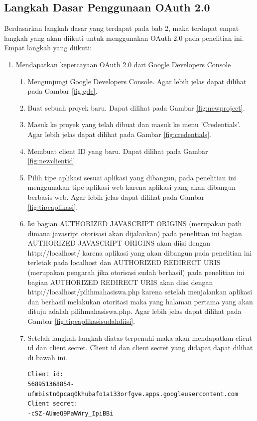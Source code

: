 \subsection{Langkah Dasar Penggunaan OAuth 2.0}
Berdasarkan langkah dasar yang terdapat pada bab 2, maka terdapat empat langkah yang akan diikuti untuk menggunakan OAuth 2.0 pada penelitian ini. Empat langkah yang diikuti:
\begin{enumerate}
\item Mendapatkan kepercayaan OAuth 2.0 dari Google Developers Console\\
    \begin{enumerate}
    \item Mengunjungi Google Developers Console. Agar lebih jelas dapat dilihat pada Gambar \ref{fig:gdc}.
    \item Buat sebuah proyek baru. Dapat dilihat pada Gambar \ref{fig:newproject}.
    \item Masuk ke proyek yang telah dibuat dan masuk ke menu 'Credentials'. Agar lebih jelas dapat dilihat pada Gambar \ref{fig:credentials}.
    \item Membuat client ID yang baru. Dapat dilihat pada Gambar \ref{fig:newclientid}.
    \item Pilih tipe aplikasi sesuai aplikasi yang dibangun, pada penelitian ini menggunakan tipe aplikasi web karena aplikasi yang akan dibangun berbasis web. Agar lebih jelas dapat dilihat pada Gambar \ref{fig:tipeaplikasi}.
    \item Isi bagian AUTHORIZED JAVASCRIPT ORIGINS (merupakan path dimana javasript otorisasi akan dijalankan) pada penelitian ini bagian AUTHORIZED JAVASCRIPT ORIGINS akan diisi dengan http://localhost/ karena aplikasi yang akan dibangun pada penelitian ini terletak pada localhost dan AUTHORIZED REDIRECT URIS (merupakan pengarah jika otorisasi sudah berhasil) pada penelitian ini bagian AUTHORIZED REDIRECT URIS akan diisi dengan http://localhost/pilihmahasiswa.php karena setelah menjalankan aplikasi dan berhasil melakukan otoritasi maka yang halaman pertama yang akan dituju adalah pilihmahasiswa.php. Agar lebih jelas dapat dilihat pada Gambar \ref{fig:tipeaplikasisudahdiisi}.
    \item Setelah langkah-langkah diatas terpenuhi maka akan mendapatkan client id dan client secret. Client id dan client secret yang didapat dapat dilihat di bawah ini.
\begin{lstlisting}
Client id:
568951368854-ufmbistn0pcaq0khubafo1a133orfgve.apps.googleusercontent.com
Client secret:
-cSZ-AUmeQ9PaWWry_IpiBBi

\end{lstlisting}
\end{enumerate}
\end{enumerate}
